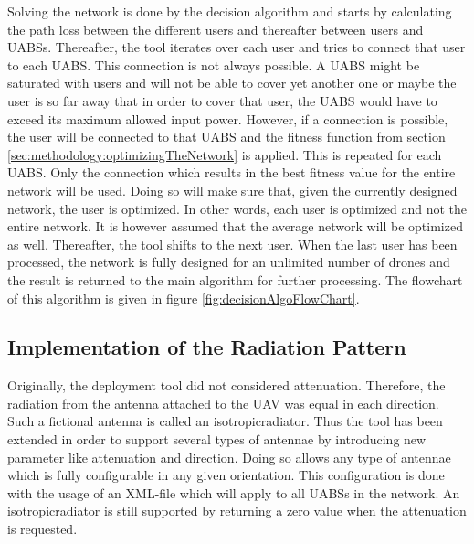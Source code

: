 \begin{minipage}{0.4\textwidth}\vspace{-120pt}%
Solving the network is done by the decision algorithm and starts by calculating the path loss
between the different users and thereafter between users and \gls{UABS}s.
Thereafter, the tool iterates over each user and tries to connect that user to each \gls{UABS}. This connection is not always possible. A \gls{UABS} might be saturated with users and 
will not be able to cover yet another one or maybe the user is so far away that in order to cover that user, the \gls{UABS} would have to exceed its maximum allowed input power.
However, if a connection is possible, the user will be connected to that \gls{UABS} and the fitness function from section \ref{sec:methodology:optimizingTheNetwork} is applied. 
This is repeated for each \gls{UABS}. Only the connection which results in the best fitness value for the entire network will be used. 
Doing so will make sure that, given the currently designed network, the user is optimized. In other words, each user is optimized and 
not the entire network. It is however assumed that the average network will be optimized as well.
Thereafter, the tool shifts to the next user. 
When the last user has been processed, the network is fully designed for an unlimited number of drones and the result is returned to the main algorithm for further processing.
The flowchart of this algorithm is given in figure \ref{fig:decisionAlgoFlowChart}.
\end{minipage}

\FloatBarrier
\subsection{Implementation of the Radiation Pattern}
\label{subsec:implementationradpat}

Originally, the deployment tool  did not considered attenuation. 
Therefore, the radiation from the antenna attached to the \gls{UAV} 
was equal in each direction. Such a fictional antenna is called an \gls{isotropicradiator}. 
Thus the tool has been extended in order 
to support several types of antennae by introducing new parameter like attenuation and direction.
Doing so allows any type of antennae which is fully configurable in any given orientation.
This configuration is done with the usage of an XML-file which will apply to all \gls{UABS}s in the network.
An \gls{isotropicradiator} is still supported by returning 
a zero value when the attenuation is requested.

